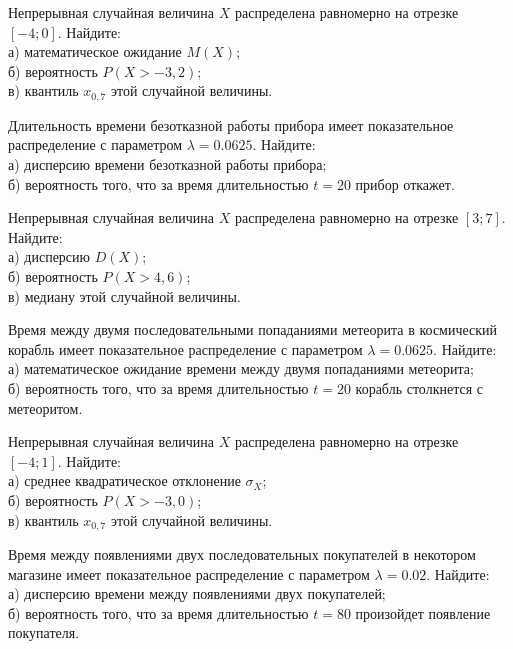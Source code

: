 \vfill

\newpage\setcounter{zad}{0}

\z Непрерывная случайная величина $X$ распределена равномерно на отрезке $[-4; 0]$. Найдите: \\ \quad а) математическое ожидание $M(X)$; \\ \quad б) вероятность $P(X>-3{,}2)$; \\ \quad в) квантиль $x_{0{,}7}$ этой случайной величины.


\vfill

\z Длительность времени безотказной работы прибора имеет показательное распределение с параметром $\lambda = 0.0625$. Найдите: \\ \quad а) дисперсию времени безотказной работы прибора; \\ \quad б) вероятность того, что за время длительностью $t = 20$ прибор  откажет.
 

\vfill

\newpage\setcounter{zad}{0}

\z Непрерывная случайная величина $X$ распределена равномерно на отрезке $[3; 7]$. Найдите: \\ \quad а) дисперсию $D(X)$; \\ \quad б) вероятность $P(X>4{,}6)$; \\ \quad в) медиану этой случайной величины.


\vfill

\z Время между двумя последовательными попаданиями метеорита в космический корабль имеет показательное распределение с параметром $\lambda = 0.0625$. Найдите: \\ \quad а) математическое ожидание времени между двумя попаданиями метеорита; \\ \quad б) вероятность того, что за время длительностью $t = 20$ корабль  столкнется с метеоритом.
 

\vfill

\newpage\setcounter{zad}{0}

\z Непрерывная случайная величина $X$ распределена равномерно на отрезке $[-4; 1]$. Найдите: \\ \quad а) среднее квадратическое отклонение $\sigma_X$; \\ \quad б) вероятность $P(X>-3{,}0)$; \\ \quad в) квантиль $x_{0{,}7}$ этой случайной величины.


\vfill

\z Время между появлениями двух последовательных покупателей в некотором магазине имеет показательное распределение с параметром $\lambda = 0.02$. Найдите: \\ \quad а) дисперсию времени между появлениями двух покупателей; \\ \quad б) вероятность того, что за время длительностью $t = 80$  произойдет появление покупателя.
 

